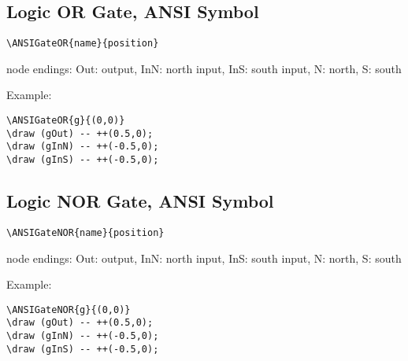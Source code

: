 \documentclass[parskip=full]{scrartcl}
\begin{document}
\subsection{Logic OR Gate, ANSI Symbol}

\begin{verbatim}
\ANSIGateOR{name}{position}
\end{verbatim}
node endings: Out: output,
              InN: north input, InS: south input,
              N: north, S: south

Example:\\
\begin{minipage}{0.8\textwidth}
\begin{verbatim}
\ANSIGateOR{g}{(0,0)}
\draw (gOut) -- ++(0.5,0);
\draw (gInN) -- ++(-0.5,0);
\draw (gInS) -- ++(-0.5,0);
\end{verbatim}
\end{minipage}
\begin{minipage}{0.19\textwidth}
\end{minipage}

\subsection{Logic NOR Gate, ANSI Symbol}

\begin{verbatim}
\ANSIGateNOR{name}{position}
\end{verbatim}
node endings: Out: output,
              InN: north input, InS: south input,
              N: north, S: south

Example:\\
\begin{minipage}{0.8\textwidth}
\begin{verbatim}
\ANSIGateNOR{g}{(0,0)}
\draw (gOut) -- ++(0.5,0);
\draw (gInN) -- ++(-0.5,0);
\draw (gInS) -- ++(-0.5,0);
\end{verbatim}
\end{minipage}
\begin{minipage}{0.19\textwidth}
\end{minipage}
\end{document}
